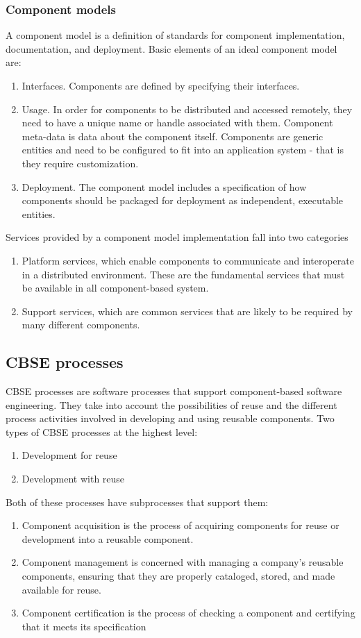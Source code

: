 \documentclass{article}
\begin{document}
\subsubsection{Component models}
A component model is a definition of standards for component implementation, documentation, and deployment.
Basic elements of an ideal component model are:
\begin{enumerate}
\item Interfaces.  Components are defined by specifying their interfaces.
\item Usage.  In order for components to be distributed and accessed remotely, they need to have a unique name or handle associated with them.  
Component meta-data is data about the component itself.
Components are generic entities and need to be configured to fit into an application system - that is they require customization.
\item Deployment.  The component model includes a specification of how components should be packaged for deployment as independent, executable entities.
\end{enumerate}
Services provided by a component model implementation fall into two categories
\begin{enumerate}
\item Platform services, which enable components to communicate and interoperate in a distributed environment.  These are the fundamental services that must be available in all component-based system.
\item Support services, which are common services that are likely to be required by many different components.  
\end{enumerate}

\subsection{CBSE processes}
CBSE processes are software processes that support component-based software engineering.  They take into account the possibilities of reuse and the different process activities involved in developing and using reusable components.
Two types of CBSE processes at the highest level:
\begin{enumerate}
\item Development for reuse
\item Development with reuse
\end{enumerate}
Both of these processes have subprocesses that support them:
\begin{enumerate}
\item Component acquisition is the process of acquiring components for reuse or development into a reusable component.
\item Component management is concerned with managing a company's reusable components, ensuring that they are properly cataloged, stored, and made available for reuse.
\item Component certification is the process of checking a component and certifying that it meets its specification
\end{enumerate}
\end{document}
